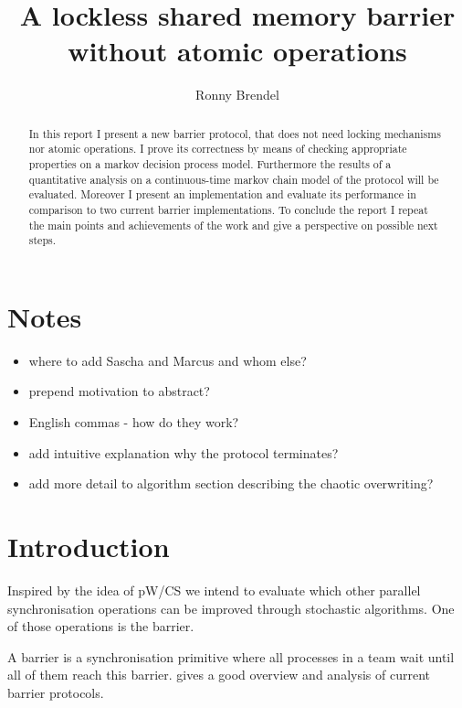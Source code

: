 \documentclass[a4paper, 10pt]{article}
\title{A lockless shared memory barrier without atomic operations}
\author{Ronny Brendel}
\begin{document}
\section*{Notes}
\begin{itemize}
	\item where to add Sascha and Marcus and whom else?
	\item prepend motivation to abstract?
	\item English commas - how do they work?
	\item add intuitive explanation why the protocol terminates?
	\item add more detail to algorithm section describing the chaotic overwriting?
\end{itemize}

\pagebreak

\maketitle

\begin{abstract}
In this report I present a new barrier protocol, that does not need locking mechanisms nor atomic operations. I prove its correctness by means of checking appropriate properties on a markov decision process model. Furthermore the results of a quantitative analysis on a continuous-time markov chain model of the protocol will be evaluated. Moreover I present an implementation and evaluate its performance in comparison to two current barrier implementations. To conclude the report I repeat the main points and achievements of the work and give a perspective on possible next steps.
\end{abstract}

\section{Introduction}
Inspired by the idea of pW/CS\cite{pwcs} we intend to evaluate which other parallel synchronisation operations can be improved through stochastic algorithms. One of those operations is the barrier.

A barrier is a synchronisation primitive where all processes in a team wait until all of them reach this barrier. \cite{hoefler2005} gives a good overview and analysis of current barrier protocols.
\end{document}

